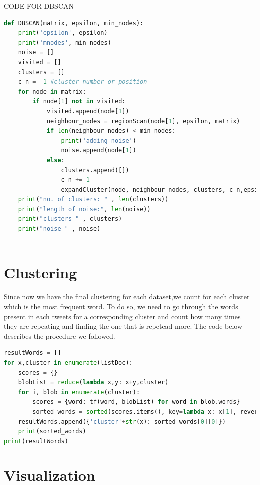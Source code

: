 \documentclass{article}
\begin{document}
CODE FOR DBSCAN
\begin{lstlisting}[language=Python, caption= DBSCAN Algorithm, label={lst:DBSCAN implementation}]
def DBSCAN(matrix, epsilon, min_nodes):
    print('epsilon', epsilon)
    print('mnodes', min_nodes)
    noise = []
    visited = []
    clusters = []
    c_n = -1 #cluster number or position
    for node in matrix:
        if node[1] not in visited:
            visited.append(node[1])
            neighbour_nodes = regionScan(node[1], epsilon, matrix)
            if len(neighbour_nodes) < min_nodes:
                print('adding noise')
                noise.append(node[1])
            else:
                clusters.append([])
                c_n += 1
                expandCluster(node, neighbour_nodes, clusters, c_n,epsilon, min_nodes, matrix, visited)
    print("no. of clusters: " , len(clusters))
    print("length of noise:", len(noise))
    print("clusters " , clusters)
    print("noise " , noise)
            
            \end{lstlisting}

        \section{Clustering}
        
Since now we have the final clustering for each dataset,we count for each cluster which is the most frequent word. To do so, we need to go through the words present in each tweets for a corresponding cluster and count how many times they are repeating and finding the one that is repetead more. The code below describes the procedure we followed. 

\begin{lstlisting}[language=Python, caption= Mostly used word/cluster, label={lst:Mostly used word/cluster}]
resultWords = []
for x,cluster in enumerate(listDoc):
    scores = {}
    blobList = reduce(lambda x,y: x+y,cluster)
    for i, blob in enumerate(cluster):
        scores = {word: tf(word, blobList) for word in blob.words}
        sorted_words = sorted(scores.items(), key=lambda x: x[1], reverse=True)
    resultWords.append({'cluster'+str(x): sorted_words[0][0]})
    print(sorted_words)
print(resultWords)
 \end{lstlisting}

        \section{Visualization}
        
\end{document}
